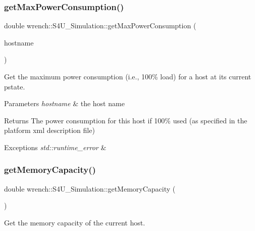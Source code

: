 \subsubsection{\texorpdfstring{get\+Max\+Power\+Consumption()}{getMaxPowerConsumption()}}
{\footnotesize\ttfamily double wrench\+::\+S4\+U\+\_\+\+Simulation\+::get\+Max\+Power\+Consumption (\begin{DoxyParamCaption}\item[{const std\+::string \&}]{hostname }\end{DoxyParamCaption})\hspace{0.3cm}{\ttfamily [static]}}



Get the maximum power consumption (i.\+e., 100\% load) for a host at its current pstate. 


\begin{DoxyParams}{Parameters}
{\em hostname} & the host name \\
\hline
\end{DoxyParams}
\begin{DoxyReturn}{Returns}
The power consumption for this host if 100\% used (as specified in the platform xml description file) 
\end{DoxyReturn}

\begin{DoxyExceptions}{Exceptions}
{\em std\+::runtime\+\_\+error} & \\
\hline
\end{DoxyExceptions}
\mbox{\label{classwrench_1_1_s4_u___simulation_a3336a395e2463b4fcfd921d9fec190f9}} 
\subsubsection{\texorpdfstring{get\+Memory\+Capacity()}{getMemoryCapacity()}}
{\footnotesize\ttfamily double wrench\+::\+S4\+U\+\_\+\+Simulation\+::get\+Memory\+Capacity (\begin{DoxyParamCaption}{ }\end{DoxyParamCaption})\hspace{0.3cm}{\ttfamily [static]}}



Get the memory capacity of the current host. 

